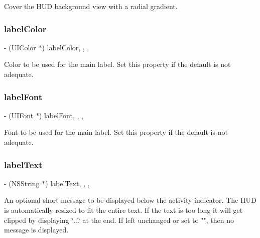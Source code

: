 Cover the H\+UD background view with a radial gradient. \mbox{\label{interface_m_b_progress_h_u_d_a9c84b50c6e30381e1ce0d9ea6cb504db}} 
\subsubsection{\texorpdfstring{label\+Color}{labelColor}}
{\footnotesize\ttfamily -\/ (U\+I\+Color $\ast$) label\+Color\hspace{0.3cm}{\ttfamily [read]}, {\ttfamily [write]}, {\ttfamily [atomic]}, {\ttfamily [assign]}}

Color to be used for the main label. Set this property if the default is not adequate. \mbox{\label{interface_m_b_progress_h_u_d_a85b03f18b8313f4c3efc2002ad79ff27}} 
\subsubsection{\texorpdfstring{label\+Font}{labelFont}}
{\footnotesize\ttfamily -\/ (U\+I\+Font $\ast$) label\+Font\hspace{0.3cm}{\ttfamily [read]}, {\ttfamily [write]}, {\ttfamily [atomic]}, {\ttfamily [assign]}}

Font to be used for the main label. Set this property if the default is not adequate. \mbox{\label{interface_m_b_progress_h_u_d_ae43d72850b8dd657db1b383be0566093}} 
\subsubsection{\texorpdfstring{label\+Text}{labelText}}
{\footnotesize\ttfamily -\/ (N\+S\+String $\ast$) label\+Text\hspace{0.3cm}{\ttfamily [read]}, {\ttfamily [write]}, {\ttfamily [atomic]}, {\ttfamily [copy]}}

An optional short message to be displayed below the activity indicator. The H\+UD is automatically resized to fit the entire text. If the text is too long it will get clipped by displaying \char`\"{}...\char`\"{} at the end. If left unchanged or set to "", then no message is displayed. \mbox{\label{interface_m_b_progress_h_u_d_a4126e72234f8afcb87905a9ed65c022c}} 
